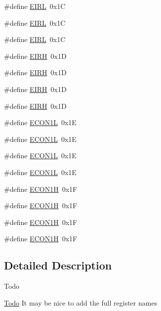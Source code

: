 \begin{DoxyCompactItemize}
\item 
\#define \mbox{\hyperlink{group___b_a_n_k__0_ga2bbf74cf1cb5367d111476ffd5fcdd33}{E\+I\+RL}}~0x1C
\item 
\#define \mbox{\hyperlink{group___b_a_n_k__0_ga2bbf74cf1cb5367d111476ffd5fcdd33}{E\+I\+RL}}~0x1C
\item 
\#define \mbox{\hyperlink{group___b_a_n_k__0_ga2bbf74cf1cb5367d111476ffd5fcdd33}{E\+I\+RL}}~0x1C
\item 
\#define \mbox{\hyperlink{group___b_a_n_k__0_ga93ae3cd8715af8b617af2a957b117dbc}{E\+I\+RH}}~0x1D
\item 
\#define \mbox{\hyperlink{group___b_a_n_k__0_ga93ae3cd8715af8b617af2a957b117dbc}{E\+I\+RH}}~0x1D
\item 
\#define \mbox{\hyperlink{group___b_a_n_k__0_ga93ae3cd8715af8b617af2a957b117dbc}{E\+I\+RH}}~0x1D
\item 
\#define \mbox{\hyperlink{group___b_a_n_k__0_ga93ae3cd8715af8b617af2a957b117dbc}{E\+I\+RH}}~0x1D
\item 
\#define \mbox{\hyperlink{group___b_a_n_k__0_ga86f1c532ca33c5b3310b32ae5065af31}{E\+C\+O\+N1L}}~0x1E
\item 
\#define \mbox{\hyperlink{group___b_a_n_k__0_ga86f1c532ca33c5b3310b32ae5065af31}{E\+C\+O\+N1L}}~0x1E
\item 
\#define \mbox{\hyperlink{group___b_a_n_k__0_ga86f1c532ca33c5b3310b32ae5065af31}{E\+C\+O\+N1L}}~0x1E
\item 
\#define \mbox{\hyperlink{group___b_a_n_k__0_ga86f1c532ca33c5b3310b32ae5065af31}{E\+C\+O\+N1L}}~0x1E
\item 
\#define \mbox{\hyperlink{group___b_a_n_k__0_ga2f5fa37a9f050116da15bf29f34308a1}{E\+C\+O\+N1H}}~0x1F
\item 
\#define \mbox{\hyperlink{group___b_a_n_k__0_ga2f5fa37a9f050116da15bf29f34308a1}{E\+C\+O\+N1H}}~0x1F
\item 
\#define \mbox{\hyperlink{group___b_a_n_k__0_ga2f5fa37a9f050116da15bf29f34308a1}{E\+C\+O\+N1H}}~0x1F
\item 
\#define \mbox{\hyperlink{group___b_a_n_k__0_ga2f5fa37a9f050116da15bf29f34308a1}{E\+C\+O\+N1H}}~0x1F
\end{DoxyCompactItemize}


\subsection{Detailed Description}
\begin{DoxyRefDesc}{Todo}
\item[\mbox{\hyperlink{todo__todo000003}{Todo}}]It may be nice to add the full register names\end{DoxyRefDesc}


